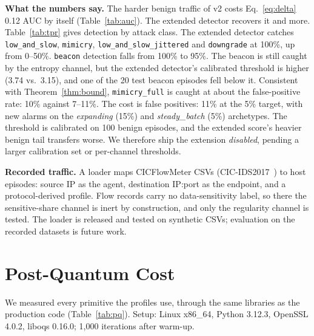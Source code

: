 \documentclass[conference]{IEEEtran}
\theoremstyle{remark}
\begin{document}
\textbf{What the numbers say.} The harder benign traffic of v2 costs Eq.~\eqref{eq:delta} 0.12 AUC by itself (Table~\ref{tab:auc}). The extended detector recovers it and more. Table~\ref{tab:tpr} gives detection by attack class. The extended detector catches \texttt{low\_and\_slow}, \texttt{mimicry}, \texttt{low\_and\_slow\_jittered} and \texttt{downgrade} at 100\%, up from 0--50\%. \texttt{beacon} detection falls from 100\% to 95\%. The beacon is still caught by the entropy channel, but the extended detector's calibrated threshold is higher (3.74 vs.\ 3.15), and one of the 20 test beacon episodes fell below it. Consistent with Theorem~\ref{thm:bound}, \texttt{mimicry\_full} is caught at about the false-positive rate: 10\% against 7--11\%. The cost is false positives: 11\% at the 5\% target, with new alarms on the \emph{expanding} (15\%) and \emph{steady\_batch} (5\%) archetypes. The threshold is calibrated on 100 benign episodes, and the extended score's heavier benign tail transfers worse. We therefore ship the extension \emph{disabled}, pending a larger calibration set or per-channel thresholds.

\textbf{Recorded traffic.} A loader maps CICFlowMeter CSVs (CIC-IDS2017~\cite{sharafaldin2018}) to host episodes: source IP as the agent, destination IP:port as the endpoint, and a protocol-derived profile. Flow records carry no data-sensitivity label, so there the sensitive-share channel is inert by construction, and only the regularity channel is tested. The loader is released and tested on synthetic CSVs; evaluation on the recorded datasets is future work.

\section{Post-Quantum Cost}
We measured every primitive the profiles use, through the same libraries as the production code (Table~\ref{tab:pq}). Setup: Linux x86\_64, Python 3.12.3, OpenSSL 4.0.2, liboqs 0.16.0; 1{,}000 iterations after warm-up.
\end{document}
